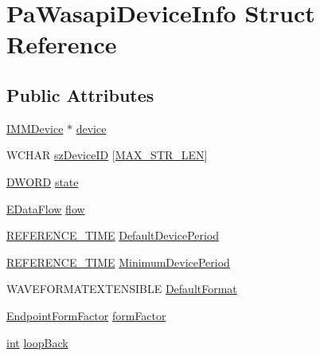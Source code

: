 \hypertarget{struct_pa_wasapi_device_info}{}\section{Pa\+Wasapi\+Device\+Info Struct Reference}
\label{struct_pa_wasapi_device_info}
\subsection*{Public Attributes}
\begin{DoxyCompactItemize}
\item 
\hyperlink{mmdeviceapi_8h_a8d4cacf41e022eb8b6aed6231bcf54be}{I\+M\+M\+Device} $\ast$ \hyperlink{struct_pa_wasapi_device_info_ae0c5e0acfb5e38e2c42f2dd11d8f0e80}{device}
\item 
W\+C\+H\+AR \hyperlink{struct_pa_wasapi_device_info_ab4eccd4b97f01c9d969e28568dc33a13}{sz\+Device\+ID} \mbox{[}\hyperlink{pa__win__wasapi_8c_a58ce36916c399104e18d32ff090f21c6}{M\+A\+X\+\_\+\+S\+T\+R\+\_\+\+L\+EN}\mbox{]}
\item 
\hyperlink{mapinls_8h_ad342ac907eb044443153a22f964bf0af}{D\+W\+O\+RD} \hyperlink{struct_pa_wasapi_device_info_a51051f47a56a2ba215784912fcc64f90}{state}
\item 
\hyperlink{mmdeviceapi_8h_a9f6154b3634cb3b90d016eced3882206}{E\+Data\+Flow} \hyperlink{struct_pa_wasapi_device_info_a58ad544b2b413b8bd19514e8d115ebb8}{flow}
\item 
\hyperlink{ksmedia_8h_a83927f70641d4e9a344563bd9ddb15ae}{R\+E\+F\+E\+R\+E\+N\+C\+E\+\_\+\+T\+I\+ME} \hyperlink{struct_pa_wasapi_device_info_a0639bc7454ecd808aa7fed3ed1436822}{Default\+Device\+Period}
\item 
\hyperlink{ksmedia_8h_a83927f70641d4e9a344563bd9ddb15ae}{R\+E\+F\+E\+R\+E\+N\+C\+E\+\_\+\+T\+I\+ME} \hyperlink{struct_pa_wasapi_device_info_addab082d2de47dd4039b87efe9d73d71}{Minimum\+Device\+Period}
\item 
W\+A\+V\+E\+F\+O\+R\+M\+A\+T\+E\+X\+T\+E\+N\+S\+I\+B\+LE \hyperlink{struct_pa_wasapi_device_info_a68b444dda6b3735f450435b7d0085791}{Default\+Format}
\item 
\hyperlink{mmdeviceapi_8h_aae2d97e980403d559aa89d27bdc8c080}{Endpoint\+Form\+Factor} \hyperlink{struct_pa_wasapi_device_info_a39c131f0bf387fcda41fd1d736e87acb}{form\+Factor}
\item 
\hyperlink{xmltok_8h_a5a0d4a5641ce434f1d23533f2b2e6653}{int} \hyperlink{struct_pa_wasapi_device_info_af800b0c1a7565b47cbd38c553bfa317e}{loop\+Back}
\end{DoxyCompactItemize}


